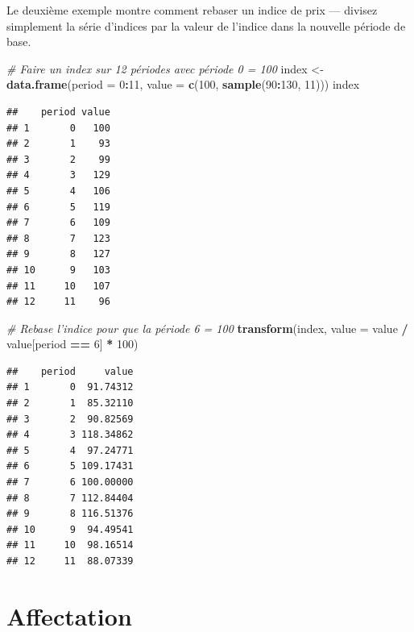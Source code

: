 \documentclass[]{article}
\newenvironment{Shaded}{\begin{snugshade}}{\end{snugshade}}
\newcommand{\CommentTok}[1]{\textcolor[rgb]{0.56,0.35,0.01}{\textit{#1}}}
\newcommand{\DataTypeTok}[1]{\textcolor[rgb]{0.13,0.29,0.53}{#1}}
\newcommand{\DecValTok}[1]{\textcolor[rgb]{0.00,0.00,0.81}{#1}}
\newcommand{\KeywordTok}[1]{\textcolor[rgb]{0.13,0.29,0.53}{\textbf{#1}}}
\newcommand{\NormalTok}[1]{#1}
\newcommand{\OperatorTok}[1]{\textcolor[rgb]{0.81,0.36,0.00}{\textbf{#1}}}
\newcommand{\StringTok}[1]{\textcolor[rgb]{0.31,0.60,0.02}{#1}}
\begin{document}
Le deuxième exemple montre comment rebaser un indice de prix --- divisez simplement la série d'indices par la valeur de l'indice dans la nouvelle période de base.

\begin{Shaded}
\begin{Highlighting}[]
\CommentTok{# Faire un index sur 12 périodes avec période 0 = 100}
\NormalTok{index <-}\StringTok{ }\KeywordTok{data.frame}\NormalTok{(}\DataTypeTok{period =} \DecValTok{0}\OperatorTok{:}\DecValTok{11}\NormalTok{, }\DataTypeTok{value =} \KeywordTok{c}\NormalTok{(}\DecValTok{100}\NormalTok{, }\KeywordTok{sample}\NormalTok{(}\DecValTok{90}\OperatorTok{:}\DecValTok{130}\NormalTok{, }\DecValTok{11}\NormalTok{)))}
\NormalTok{index}
\end{Highlighting}
\end{Shaded}

\begin{verbatim}
##    period value
## 1       0   100
## 2       1    93
## 3       2    99
## 4       3   129
## 5       4   106
## 6       5   119
## 7       6   109
## 8       7   123
## 9       8   127
## 10      9   103
## 11     10   107
## 12     11    96
\end{verbatim}

\begin{Shaded}
\begin{Highlighting}[]
\CommentTok{# Rebase l'indice pour que la période 6 = 100}
\KeywordTok{transform}\NormalTok{(index, }\DataTypeTok{value =}\NormalTok{ value }\OperatorTok{/}\StringTok{ }\NormalTok{value[period }\OperatorTok{==}\StringTok{ }\DecValTok{6}\NormalTok{] }\OperatorTok{*}\StringTok{ }\DecValTok{100}\NormalTok{)}
\end{Highlighting}
\end{Shaded}

\begin{verbatim}
##    period     value
## 1       0  91.74312
## 2       1  85.32110
## 3       2  90.82569
## 4       3 118.34862
## 5       4  97.24771
## 6       5 109.17431
## 7       6 100.00000
## 8       7 112.84404
## 9       8 116.51376
## 10      9  94.49541
## 11     10  98.16514
## 12     11  88.07339
\end{verbatim}

\hypertarget{affectation}{%
\section{Affectation}\label{affectation}}
\end{document}
